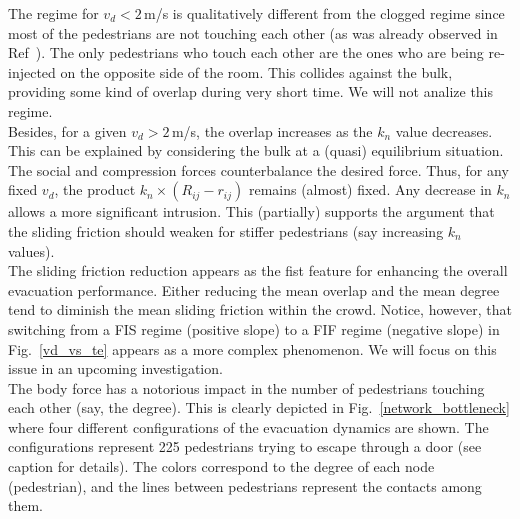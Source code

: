 \documentclass[preprint,12pt]{elsarticle}
\begin{document}
The regime for $v_d<2\,$m/s is qualitatively different from the clogged regime since most of the 
pedestrians are not touching each other (as was already observed in Ref~\cite{dorso_2005,dorso_2011}). The only pedestrians who touch each 
other are the ones who are being re-injected on the opposite side of the room.
This collides against the bulk, providing some kind of overlap during very short time. We will
not analize this regime.\\

Besides, for a given $v_d>2\,$m/s, the overlap increases as the $k_n$ value decreases. 
This can be explained by considering the bulk at a (quasi) equilibrium situation. 
The social and compression forces counterbalance the desired force. Thus, for any fixed $v_d$,
the product $k_n \times (R_{ij}-r_{ij})$ remains (almost) fixed. Any decrease in $k_n$
allows a more significant intrusion. This (partially) supports the argument that
the sliding friction should weaken for stiffer pedestrians (say increasing
$k_n$ values). \\  


The sliding friction reduction appears as the fist feature for enhancing
the overall evacuation performance. Either reducing the mean overlap and the mean degree
tend to diminish the mean sliding 
friction within the crowd. 
Notice, however, that switching from a FIS regime (positive slope) to a  FIF 
regime (negative slope) in Fig.~\ref{vd_vs_te} appears as a more complex 
phenomenon. We will focus on this issue in an upcoming investigation.\\

The body force 
has a notorious impact in the number of pedestrians touching each other (say, 
the degree). This is clearly depicted in Fig.~\ref{network_bottleneck} where 
four different configurations of the evacuation dynamics are shown. The 
configurations represent 225 pedestrians trying to escape through a door (see 
caption for details). The colors correspond to the degree of each node 
(pedestrian), and the lines between pedestrians represent the contacts among 
them.\\
\end{document}
